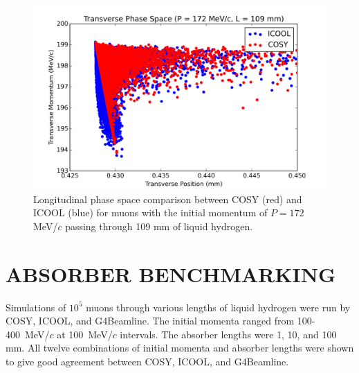 \documentclass[a4paper,11pt]{article}
\begin{document}
\begin{figure}[htb]
\centering
\includegraphics[width=\columnwidth]{Figures/tof}
\caption{Longitudinal phase space comparison between COSY (red) and ICOOL (blue) for muons with the initial momentum of $P=172$ MeV/$c$ passing through 109 mm of liquid hydrogen.}
\label{fig:tof}
\end{figure}






\fi



\section{ABSORBER BENCHMARKING}
Simulations of $10^5$ muons through various lengths of liquid hydrogen were run by COSY, ICOOL, and G4Beamline. The initial momenta ranged from 100-400~MeV/$c$ at 100~MeV/$c$ intervals. The absorber lengths were 1, 10, and 100 mm. All twelve combinations of initial momenta and absorber lengths were shown to give good agreement between COSY, ICOOL, and G4Beamline.
\end{document}
